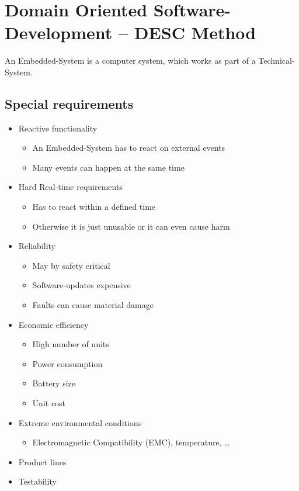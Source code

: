 \hypertarget{domain-oriented-software-development-desc-method}{%
\section{Domain Oriented Software-Development -- DESC
Method}\label{domain-oriented-software-development-desc-method}}

An Embedded-System is a computer system, which works as part of a Technical-System.

\hypertarget{special-requirements}{%
\subsection{Special requirements}\label{special-requirements}}

\begin{itemize}
\tightlist
\item
  Reactive functionality

  \begin{itemize}
  \tightlist
  \item
    An Embedded-System has to react on external events
  \item
    Many events can happen at the same time
  \end{itemize}
\item
  Hard Real-time requirements

  \begin{itemize}
  \tightlist
  \item
    Has to react within a defined time
  \item
    Otherwise it is just unusable or it can even cause harm
  \end{itemize}
\item
  Reliability

  \begin{itemize}
  \tightlist
  \item
    May by safety critical
  \item
    Software-updates expensive
  \item
    Faults can cause material damage
  \end{itemize}
\item
  Economic efficiency

  \begin{itemize}
  \tightlist
  \item
    High number of units
  \item
    Power consumption
  \item
    Battery size
  \item
    Unit cost
  \end{itemize}
\item
  Extreme environmental conditions

  \begin{itemize}
  \tightlist
  \item
    Electromagnetic Compatibility (EMC), temperature, \ldots{}
  \end{itemize}
\item
  Product lines
\item
  Testability
\end{itemize}
\clearpage

